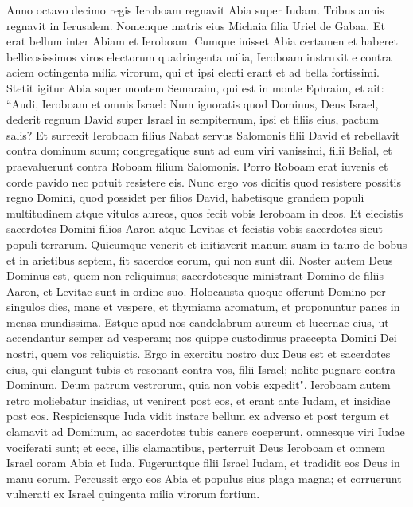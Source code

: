 \begin{biblechapter}  
\verse Anno octavo decimo regis Ieroboam regnavit Abia super Iudam. 
\verse Tribus annis regnavit in Ierusalem. Nomenque matris eius Michaia filia Uriel de Gabaa. Et erat bellum inter Abiam et Ieroboam. 
\verse Cumque inisset Abia certamen et haberet bellicosissimos viros electorum quadringenta milia, Ieroboam instruxit e contra aciem octingenta milia virorum, qui et ipsi electi erant et ad bella fortissimi. 
\verse Stetit igitur Abia super montem Semaraim, qui est in monte Ephraim, et ait: “Audi, Ieroboam et omnis Israel: 
\verse Num ignoratis quod Dominus, Deus Israel, dederit regnum David super Israel in sempiternum, ipsi et filiis eius, pactum salis? 
\verse Et surrexit Ieroboam filius Nabat servus Salomonis filii David et rebellavit contra dominum suum; 
\verse congregatique sunt ad eum viri vanissimi, filii Belial, et praevaluerunt contra Roboam filium Salomonis. Porro Roboam erat iuvenis et corde pavido nec potuit resistere eis. 
\verse Nunc ergo vos dicitis quod resistere possitis regno Domini, quod possidet per filios David, habetisque grandem populi multitudinem atque vitulos aureos, quos fecit vobis Ieroboam in deos. 
\verse Et eiecistis sacerdotes Domini filios Aaron atque Levitas et fecistis vobis sacerdotes sicut populi terrarum. Quicumque venerit et initiaverit manum suam in tauro de bobus et in arietibus septem, fit sacerdos eorum, qui non sunt dii. 
\verse Noster autem Deus Dominus est, quem non reliquimus; sacerdotesque ministrant Domino de filiis Aaron, et Levitae sunt in ordine suo. 
\verse Holocausta quoque offerunt Domino per singulos dies, mane et vespere, et thymiama aromatum, et proponuntur panes in mensa mundissima. Estque apud nos candelabrum aureum et lucernae eius, ut accendantur semper ad vesperam; nos quippe custodimus praecepta Domini Dei nostri, quem vos reliquistis. 
\verse Ergo in exercitu nostro dux Deus est et sacerdotes eius, qui clangunt tubis et resonant contra vos, filii Israel; nolite pugnare contra Dominum, Deum patrum vestrorum, quia non vobis expedit". 
\verse Ieroboam autem retro moliebatur insidias, ut venirent post eos, et erant ante Iudam, et insidiae post eos. 
\verse Respiciensque Iuda vidit instare bellum ex adverso et post tergum et clamavit ad Dominum, ac sacerdotes tubis canere coeperunt, 
\verse omnesque viri Iudae vociferati sunt; et ecce, illis clamantibus, perterruit Deus Ieroboam et omnem Israel coram Abia et Iuda. 
\verse Fugeruntque filii Israel Iudam, et tradidit eos Deus in manu eorum. 
\verse Percussit ergo eos Abia et populus eius plaga magna; et corruerunt vulnerati ex Israel quingenta milia virorum fortium. 

\end{biblechapter}
